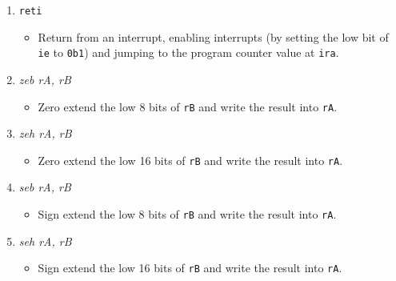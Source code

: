 \documentclass{article}
\begin{document}
\begin{itemize}
\begin{enumerate}
			\item \texttt{reti}
				\begin{itemize}
				\item Return from an interrupt, enabling interrupts
					(by setting the low bit of \texttt{ie} to \texttt{0b1})
					and jumping to the program counter value at
					\texttt{ira}.
				\end{itemize}

			\item \textit{zeb rA, rB}
				\begin{itemize}
				\item Zero extend the low 8 bits of \texttt{rB} and write
					the result into \texttt{rA}.
				\end{itemize}
			\item \textit{zeh rA, rB}
				\begin{itemize}
				\item Zero extend the low 16 bits of \texttt{rB} and write
					the result into \texttt{rA}.
				\end{itemize}
			\item \textit{seb rA, rB}
				\begin{itemize}
				\item Sign extend the low 8 bits of \texttt{rB} and write
					the result into \texttt{rA}.
				\end{itemize}
			\item \textit{seh rA, rB}
				\begin{itemize}
				\item Sign extend the low 16 bits of \texttt{rB} and write
					the result into \texttt{rA}.
				\end{itemize}
			\end{enumerate}
		\end{itemize}


\end{document}
